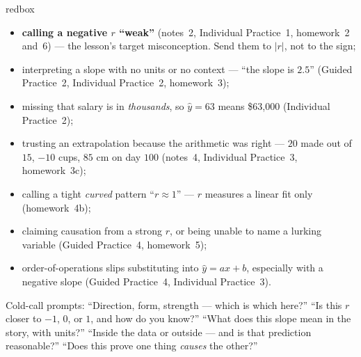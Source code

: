 \documentclass[10pt]{article}
\begin{document}
\boxguard
\begin{skillbox}{redbox}
\begin{itemize}[leftmargin=1.2em, nosep]
  \item \textbf{calling a negative $r$ ``weak''} (notes~2, Individual Practice~1, homework~2
        and~6) --- the lesson's target misconception. Send them to $|r|$, not to the sign;
  \item interpreting a slope with no units or no context --- ``the slope is $2.5$'' (Guided
        Practice~2, Individual Practice~2, homework~3);
  \item missing that salary is in \emph{thousands}, so $\hat y=63$ means \$63{,}000
        (Individual Practice~2);
  \item trusting an extrapolation because the arithmetic was right --- $20$ made out of $15$,
        $-10$ cups, $85$ cm on day $100$ (notes~4, Individual Practice~3, homework~3c);
  \item calling a tight \emph{curved} pattern ``$r\approx1$'' --- $r$ measures a linear fit only
        (homework~4b);
  \item claiming causation from a strong $r$, or being unable to name a lurking variable
        (Guided Practice~4, homework~5);
  \item order-of-operations slips substituting into $\hat y=ax+b$, especially with a negative
        slope (Guided Practice~4, Individual Practice~3).
\end{itemize}
Cold-call prompts: ``Direction, form, strength --- which is which here?'' ``Is this $r$ closer to
$-1$, $0$, or $1$, and how do you know?'' ``What does this slope mean in the story, with units?''
``Inside the data or outside --- and is that prediction reasonable?'' ``Does this prove one thing
\emph{causes} the other?''
\end{skillbox}
\end{document}
